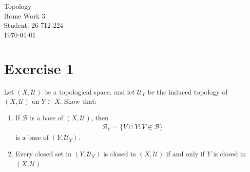 \documentclass[12pt]{article}
\begin{document}
\begin{titlepage}
\centering
\vspace*{\fill} %
{\Huge Topology} \\[0.5cm] %
{\Huge Home Work 3}\\[1.5cm] %
{\Large Student: 26-712-224}\\[0.5cm] %
{\Large \today} %
\vspace*{\fill}
\end{titlepage}

\newpage
\noindent
\section*{Exercise 1}
Let $(X,\mathcal{U})$ be a topological space, and let $\mathcal{U}_Y$ be the induced topology of $(X,\mathcal{U})$ on $Y\subset X$. Show that:
\begin{enumerate}
\item[i)] If $\mathcal{B}$ is a base of $(X,\mathcal{U})$, then
\begin{align*}
\mathcal{B}_Y=\{V\cap Y:V\in\mathcal{B}\}
\end{align*}
is a base of $(Y,\mathcal{U}_Y)$.
\item[ii)] Every closed set in $(Y,\mathcal{U}_Y)$ is closed in $(X,\mathcal{U})$ if and only if $Y$ is closed in $(X,\mathcal{U})$.
\end{enumerate}
\end{document}
